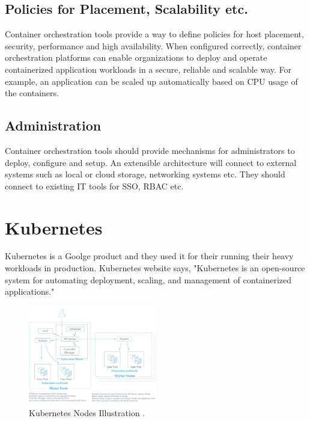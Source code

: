 \documentclass[sigconf]{acmart}
\begin{document}
	\subsection{Policies for Placement, Scalability etc.}	
	Container orchestration tools provide a way to define policies for host placement, security, performance and high availability.
	When configured correctly, container orchestration platforms can enable organizations to deploy and operate containerized
	application workloads in a secure, reliable and scalable way. For example, an application can be scaled up automatically based
	on CPU usage of the containers. 
	\subsection{Administration}	
	Container orchestration tools should provide mechanisms for administrators to deploy, configure and setup. An extensible
	architecture will connect to external systems such as local or cloud storage, networking systems etc. They should connect to
	existing IT tools for SSO, RBAC etc. 
	
	\section{Kubernetes}
	Kubernetes is a Goolge product and they used it for their running their heavy workloads in production.	
	Kubernetes website says, "Kubernetes is an open-source system for automating deployment, scaling, and management of containerized applications."
	\cite{Kubernetes}
\begin{figure}
	\includegraphics[width=0.5\textwidth]{images/Kubernetes}
	\caption{Kubernetes Nodes Illustration \cite{Platform9}.} \label{fig:figure1} 
\end{figure}
\end{document}
